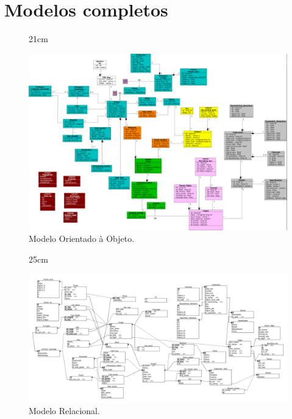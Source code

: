 \section{Modelos completos}\label{ap-1}
\begin{landscape}
\begin{figure}[ht]{21cm}
  \caption{Modelo Orientado à Objeto.} \label{modelo_00}
  \includegraphics[width=\hsize]{figuras/modelo_oo.png}
\end{figure}
\end{landscape}

\begin{landscape}
\begin{figure}[ht]{25cm}
  \caption{Modelo Relacional.} \label{modelo_r}
  \includegraphics[width=\hsize]{figuras/modelo_er.png}
\end{figure}
\end{landscape}





